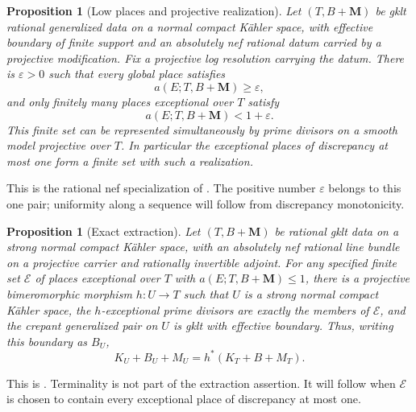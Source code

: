 \documentclass[11pt]{amsart}
\newtheorem{proposition}[theorem]{Proposition}
\theoremstyle{definition}
\theoremstyle{remark}
\numberwithin{equation}{section}
\newcommand{\M}{\mathbf{M}}
\begin{document}
\begin{proposition}[Low places and projective realization]\label{prop:low-places}
Let \((T,B+\M)\) be gklt rational generalized data on a normal compact
K\"ahler space, with effective boundary of finite support and an absolutely
nef rational datum carried by a projective modification.  Fix a projective
log resolution carrying the datum.  There is \(\varepsilon>0\) such that
every global place satisfies
\[
 a(E;T,B+\M)\geq\varepsilon,
\]
and only finitely many places exceptional over \(T\) satisfy
\[
 a(E;T,B+\M)<1+\varepsilon.
\]
This finite set can be represented simultaneously by prime divisors on a
smooth model projective over \(T\).  In particular the exceptional places
of discrepancy at most one form a finite set with such a realization.
\end{proposition}

This is the rational nef specialization of
\cite[Lemma~4.2(i)]{KahlerAuxiliary}.  The positive number
\(\varepsilon\) belongs to this one pair; uniformity along a sequence will
follow from discrepancy monotonicity.

\begin{proposition}[Exact extraction]\label{prop:extraction}
Let \((T,B+\M)\) be rational gklt data on a strong normal compact
K\"ahler space, with an absolutely nef rational line bundle on a projective
carrier and rationally invertible adjoint.  For any specified finite set
\(\mathcal E\) of places exceptional over \(T\) with
\(a(E;T,B+\M)\leq1\), there is a projective bimeromorphic morphism
\(h:U\to T\) such that \(U\) is a strong normal compact K\"ahler space,
the \(h\)-exceptional prime divisors are exactly the members of
\(\mathcal E\), and the crepant generalized pair on \(U\) is gklt with
effective boundary.  Thus, writing this boundary as \(B_U\),
\[
 K_U+B_U+M_U=h^*(K_T+B+M_T).
\]
\end{proposition}

This is \cite[Proposition~9.11]{KahlerAuxiliary}.  Terminality is not part
of the extraction assertion.  It will follow when \(\mathcal E\) is chosen
to contain every exceptional place of discrepancy at most one.
\end{document}
